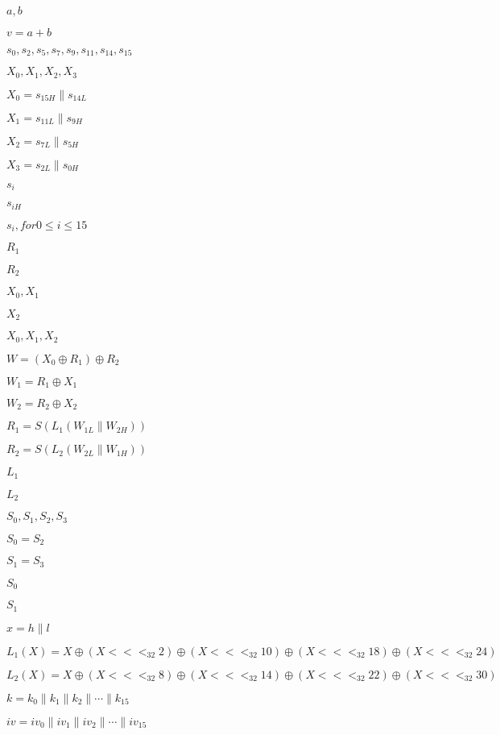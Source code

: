 \documentclass{article}
\begin{document}
$ a,b$
\pagebreak

$ v=a+b$
\pagebreak

$ s_0, s_2, s_5, s_7, s_9, s_{11}, s_{14}, s_{15}$
\pagebreak

$ X_0, X_1, X_2, X_3$
\pagebreak

$ X_0=s_{15H} \parallel s_{14L}$
\pagebreak

$ X_1=s_{11L} \parallel s_{9H}$
\pagebreak

$ X_2=s_{7L} \parallel s_{5H}$
\pagebreak

$ X_3=s_{2L} \parallel s_{0H}$
\pagebreak

$ s_i$
\pagebreak

$ s_{iH}$
\pagebreak

$ s_i, for 0 \leq i \leq 15$
\pagebreak

$ R_1$
\pagebreak

$ R_2$
\pagebreak

$ X_0, X_1$
\pagebreak

$ X_2$
\pagebreak

$ X_0, X_1, X_2$
\pagebreak

$ W=(X_0 \oplus R_1) \oplus R_2$
\pagebreak

$ W_1=R_1 \oplus X_1$
\pagebreak

$ W_2=R_2 \oplus X_2$
\pagebreak

$ R_1=S(L_1(W_{1L} \parallel W_{2H}))$
\pagebreak

$ R_2=S(L_2(W_{2L} \parallel W_{1H}))$
\pagebreak

$ L_1$
\pagebreak

$ L_2$
\pagebreak

$ S_0,S_1,S_2,S_3$
\pagebreak

$ S_0=S_2$
\pagebreak

$ S_1=S_3$
\pagebreak

$ S_0$
\pagebreak

$ S_1$
\pagebreak

$ x=h \parallel l$
\pagebreak

$ L_1(X)=X \oplus (X <<<_{32} 2) \oplus (X <<<_{32} 10) \oplus (X <<<_{32} 18) \oplus (X <<<_{32} 24)$
\pagebreak

$ L_2(X)=X \oplus (X <<<_{32} 8) \oplus (X <<<_{32} 14) \oplus (X <<<_{32} 22) \oplus (X <<<_{32} 30)$
\pagebreak

$ k=k_0 \parallel k_1 \parallel k_2 \parallel \cdots \parallel k_{15}$
\pagebreak

$ iv=iv_0 \parallel iv_1 \parallel iv_2 \parallel \cdots \parallel iv_{15}$
\pagebreak
\end{document}
